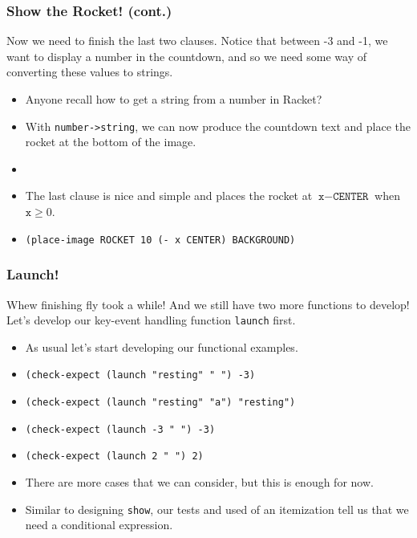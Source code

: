 \documentclass{beamer}
\begin{document}
\begin{frame}
  \frametitle{Show the Rocket! (cont.)}
  Now we need to finish the last two clauses. Notice that between -3 and -1,
  we want to display a  number in the countdown, and so we need some way of
  converting these values to strings.
  \begin{itemize}
  \item<2-> Anyone recall how to get a string from a number in Racket?
  \item<3-> With \texttt{number->string}, we can now produce
    the countdown text and place the rocket at the bottom of the image.
  \item<4-> \countDown
  \item<5-> The last clause is nice and simple and places the rocket at $\texttt{x} - \texttt{CENTER}$ when $\texttt{x} \ge 0$.
  \item<6-> \texttt{(place-image ROCKET 10 (- x CENTER) BACKGROUND)}
  \end{itemize}
\end{frame}

\begin{frame}
  \frametitle{Launch!}
  Whew finishing fly took a while! And we still have two more functions
  to develop! Let's develop our key-event handling function
  \texttt{launch} first.
  \begin{itemize}
  \item<2-> As usual let's start developing our functional examples.
  \item<3-> \texttt{(check-expect (launch "resting" " ") -3)}
  \item<4-> \texttt{(check-expect (launch "resting" "a") "resting")}
  \item<5-> \texttt{(check-expect (launch -3 " ") -3)}
  \item<6-> \texttt{(check-expect (launch 2 " ") 2)}
  \item<7-> There are more cases that we can consider, but this is enough
    for now.
  \item<8-> Similar to designing \texttt{show}, our tests and
    used of an itemization tell us that we need a conditional expression.
  \end{itemize}
\end{frame}

\end{document}
